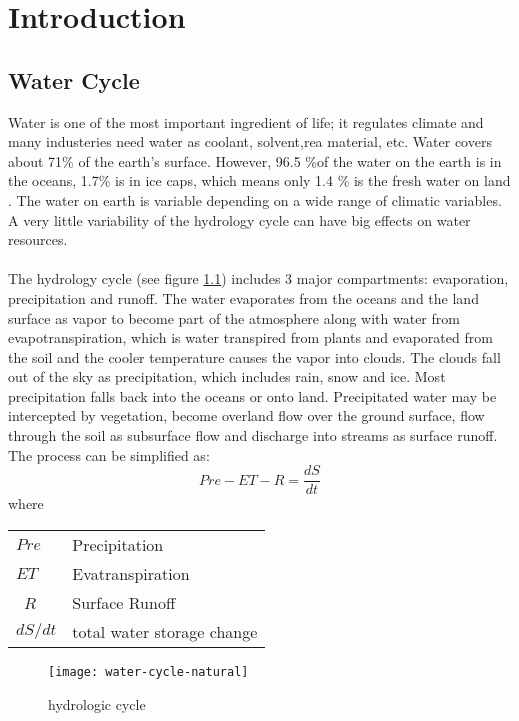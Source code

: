 \chapter{Introduction}
\section{Water Cycle}
Water is one of the most important ingredient of life; it regulates climate and many industeries need water as coolant, solvent,rea material, etc. Water covers about 71\% of the earth's surface. However, 96.5 \%of the water on the earth is in the oceans, 1.7\% is in ice caps, which means only 1.4 \% is the fresh water on land \cite{gleick1993water}. The water on earth is variable depending on a wide range of climatic variables. A very little variability of the hydrology cycle can have big effects on water resources. \cite{evans1996effects}\\\\
The hydrology cycle (see figure \ref{fig:hydrologic cycle}) includes 3 major compartments: evaporation, precipitation and runoff. The water evaporates from the oceans and the land surface as vapor to become part of the atmosphere along with water from evapotranspiration, which is water transpired from plants and evaporated from the soil and the cooler temperature causes the vapor into clouds. The clouds fall out of the sky as precipitation, which includes rain, snow and ice. Most precipitation falls back into the oceans or onto land. Precipitated water may be intercepted by vegetation, become overland flow over the ground surface, flow through the soil as subsurface flow and discharge into streams as surface runoff. The process can be simplified as:
\begin{equation}
	 Pre - ET - R = \frac{dS}{dt}
\end{equation}
where
\begin{table}[htbp]
	\begin{tabular}{ll}
		$Pre$   & Precipitation    \\ 
		$ET$    & Evatranspiration \\ \
		$R$     & Surface Runoff \\ 
		$dS / dt$ & total water storage change \\ 
	\end{tabular}
\end{table}
\begin{figure}[htbp]
	\centering
	\texttt{[image: water-cycle-natural]} %
	\caption{hydrologic cycle} 
	\label{fig:hydrologic cycle}
\end{figure}
